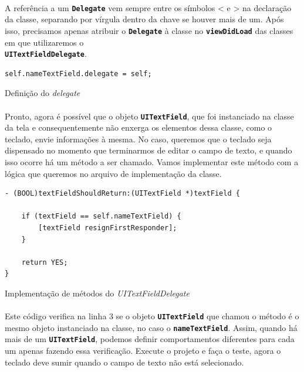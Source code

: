 \documentclass[a4paper,12pt,brazil,doubleside]{book}
\begin{document}
\begin{singlespace}
\paragraph{}A referência a um \texttt{\textbf{Delegate}} vem sempre entre os símbolos < e > na declaração da classe, separando por vírgula dentro da chave se houver mais de um. Após isso, precisamos apenas atribuir o \texttt{\textbf{Delegate}} à classe no \texttt{\textbf{viewDidLoad}} das classes em que utilizaremos o\\ \texttt{\textbf{UITextFieldDelegate}}.

\begin{listing}[H]
\begin{verbatim}
self.nameTextField.delegate = self;
\end{verbatim}
\caption{Definição do \emph{delegate}}
\end{listing}

\paragraph{}Pronto, agora é possível que o objeto \texttt{\textbf{UITextField}}, que foi instanciado na classe da tela e consequentemente não enxerga os elementos dessa classe, como o teclado, envie informações à mesma. No caso, queremos que o teclado seja dispensado no momento que terminarmos de editar o campo de texto, e quando isso ocorre há um método a ser chamado. Vamos implementar este método com a lógica que queremos no arquivo de implementação da classe.

\begin{listing}[H]
\begin{verbatim}
- (BOOL)textFieldShouldReturn:(UITextField *)textField {
    
    if (textField == self.nameTextField) {
        [textField resignFirstResponder];
    }
    
    return YES;
}
\end{verbatim}
\caption{Implementação de métodos do \emph{UITextFieldDelegate}}
\end{listing}

\paragraph{}Este código verifica na linha 3 se o objeto \texttt{\textbf{UITextField}} que chamou o método é o mesmo objeto instanciado na classe, no caso o \texttt{\textbf{nameTextField}}. Assim, quando há mais de um \texttt{\textbf{UITextField}}, podemos definir comportamentos diferentes para cada um apenas fazendo essa verificação. Execute o projeto e faça o teste, agora o teclado deve sumir quando o campo de texto não está selecionado.

\end{singlespace}
\end{document}
